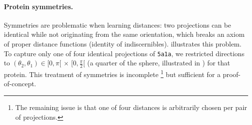 
\paragraph{Protein symmetries.}
Symmetries are problematic when learning distances: two projections can be identical while not originating from the same orientation, which breaks an axiom of proper distance functions (identity of indiscernibles).
 illustrates this problem.
To capture only one of four identical projections of \texttt{5a1a}, we restricted directions to $(\theta_2, \theta_1) \in [0, \pi[ \, \times \, [0, \frac{\pi}{2}[$ (a quarter of the sphere, illustrated in ) for that protein.
This treatment of symmetries is incomplete%
\footnote{The remaining issue is that one of four distances is arbitrarily chosen per pair of projections.}
but sufficient for a proof-of-concept.

